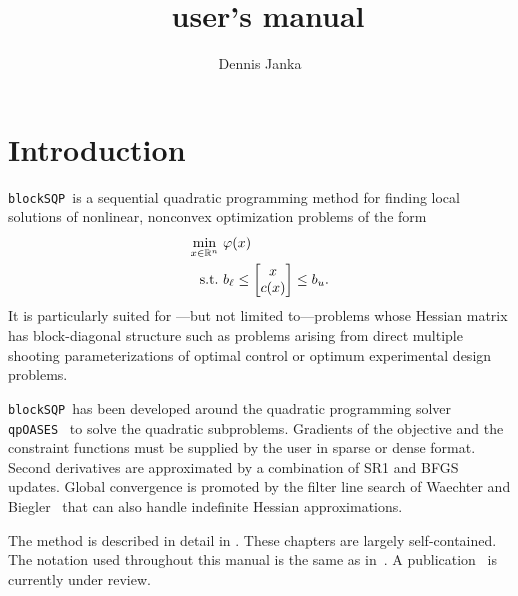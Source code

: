 \documentclass[	11pt,
				a4paper,
				abstract=true,
				twoside=true,
				bibliography=totoc, 
				headinclude=true,
				footinclude=false]{scrartcl}
\title{\blockSQP\ user's manual}
\author{Dennis Janka}
\newcommand{\R}{\mathbb{R}}				%
\newcommand{\st}{\textup{s.t.}}
\newcommand{\qpOASES}{\texttt{qpOASES}}
\newcommand{\blockSQP}{\texttt{blockSQP}}
\begin{document}
\maketitle
\tableofcontents
\clearpage
\section{Introduction}
\blockSQP\ is a sequential quadratic programming method for finding local solutions
of nonlinear, nonconvex optimization problems of the form
\begin{subequations}\label{eq:nlp}
\begin{align}
\min_{x\in\R^{n}}\ &\varphi(x) \\
\st\ & b_{\ell} \leq \begin{bmatrix} x\\c(x)\end{bmatrix} \leq b_{u}.
\end{align}
\end{subequations}
It is particularly suited for
---but not limited to---problems whose Hessian matrix has block-diagonal
structure such as problems arising from direct multiple shooting
parameterizations of optimal control or optimum experimental design problems.

\blockSQP\ has been developed around the quadratic programming solver
\qpOASES~\cite{Ferreau2013} to solve the quadratic subproblems. Gradients of the objective
and the constraint functions must be supplied by the user in sparse or dense format. 
Second derivatives are approximated by a combination of SR1 and BFGS updates. 
Global convergence is promoted by the filter line search of Waechter and Biegler~\cite{Waechter2005b,Waechter2005}
that can also handle indefinite Hessian approximations.

The method is described in detail in \cite[Chapters 6--8]{Janka2015}. These chapters are largely self-contained. The notation used throughout this manual is the same as in~\cite{Janka2015}. A publication~\cite{Janka2015b} is currently under review.

\end{document}
